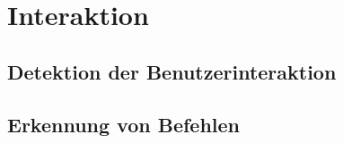 \chapter{Interaktion}

\section{Detektion der Benutzerinteraktion}

\section{Erkennung von Befehlen}
